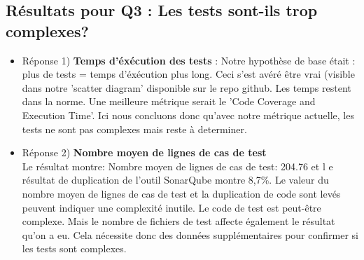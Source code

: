 \documentclass{proc}
\begin{document}
\subsection{Résultats pour Q3 : Les tests sont-ils trop complexes?}
\begin{itemize}
    \item Réponse 1) \textbf{Temps d'éxécution des tests} : Notre hypothèse de base était : plus de tests = temps d'éxécution plus long. Ceci s'est avéré être vrai (visible dans notre 'scatter diagram' disponible sur le repo github. Les temps restent dans la norme. Une meilleure métrique serait le 'Code Coverage and Execution Time'. Ici nous concluons donc qu'avec notre métrique actuelle, les tests ne sont pas complexes mais reste à determiner.
    \item Réponse 2) \textbf{Nombre moyen de lignes de cas de test}
    \\Le résultat montre: Nombre moyen de lignes de cas de test: 204.76 et l
    e résultat de duplication de l'outil SonarQube montre 8,7\%.
    Le valeur du nombre moyen de lignes de cas de test et la duplication de code sont levés peuvent indiquer une complexité inutile. Le code de test est peut-être complexe. Mais le nombre de fichiers de test affecte également le résultat qu'on a eu. Cela nécessite donc des données supplémentaires pour confirmer si les tests sont complexes.
\end{itemize}
\end{document}
